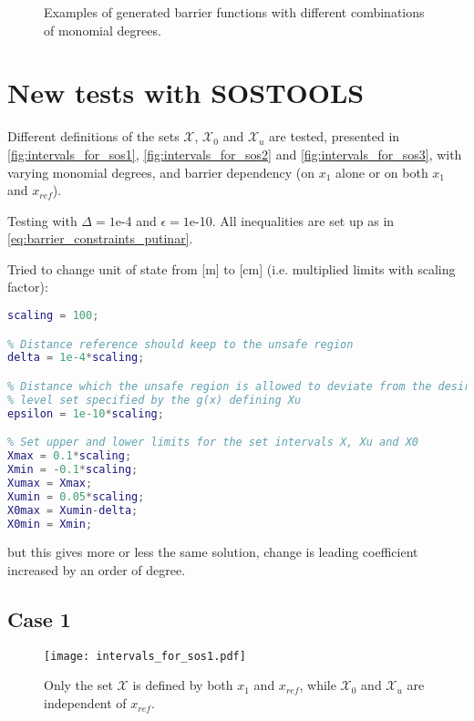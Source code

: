 \begin{figure}[H]
%
%
\hspace{1mm}
%
%
\caption{Examples of generated barrier functions with different combinations of monomial degrees.}
\end{figure}

\newpage
\section{New tests with SOSTOOLS}
Different definitions of the sets $\mathcal{X}$, $\mathcal{X}_0$ and $\mathcal{X}_u$ are tested, presented in \autoref{fig:intervals_for_sos1}, \ref{fig:intervals_for_sos2} and \ref{fig:intervals_for_sos3}, with varying monomial degrees, and barrier dependency (on $x_1$ alone or on both $x_1$ and $x_{ref}$).

Testing with $\Delta=1$e-4 and $\epsilon=1$e-10. All inequalities are set up as in \autoref{eq:barrier_constraints_putinar}.

Tried to change unit of state from [m] to [cm] (i.e. multiplied limits with scaling factor):
\begin{lstlisting}[language=matlab]
% scaling factor = 1 for [meter], or 100 for [cm]
scaling = 100;

% Distance reference should keep to the unsafe region
delta = 1e-4*scaling;

% Distance which the unsafe region is allowed to deviate from the desired zero
% level set specified by the g(x) defining Xu
epsilon = 1e-10*scaling;

% Set upper and lower limits for the set intervals X, Xu and X0
Xmax = 0.1*scaling;
Xmin = -0.1*scaling;
Xumax = Xmax;
Xumin = 0.05*scaling;
X0max = Xumin-delta;
X0min = Xmin;
\end{lstlisting}
but this gives more or less the same solution, change is leading coefficient increased by an order of degree.

\subsection{Case 1}\label{case1}
\begin{figure}[htbp]
\centering\texttt{[image: intervals\_for\_sos1.pdf]}
\caption{Only the set $\mathcal{X}$ is defined by both $x_1$ and $x_{ref}$, while $\mathcal{X}_0$ and $\mathcal{X}_u$ are independent of $x_{ref}$.}
\label{fig:intervals_for_sos1}
\end{figure}

